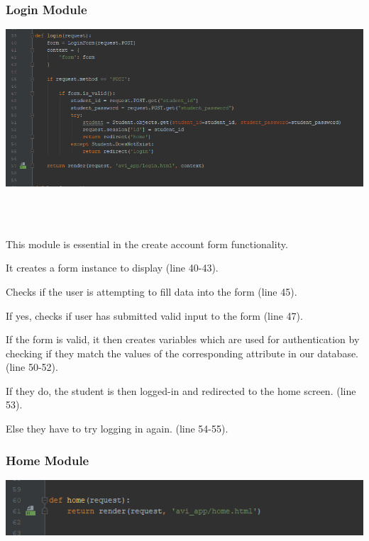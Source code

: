\documentclass[10pt]{article}
\begin{document}
\subsubsection{Login Module}

\begin{center}
\includegraphics[width=1.1\textwidth]{p7.png}
\end{center} \\ \\

\begin{description}[font=$\bullet$~\normalfont\scshape\color{red!50!black}]
\item [] This module is essential in the create account form functionality. 
\item [] It creates a form instance to display (line 40-43).
\item [] Checks if the user is attempting to fill data into the form (line 45).
\item [] If yes, checks if user has submitted valid input to the form (line 47).
\item [] If the form is valid, it then creates variables which are used for authentication by checking if they match the values of the corresponding attribute in our database. (line 50-52).
\item [] If they do, the student is then logged-in and redirected to the home screen. (line 53).
\item [] Else they have to try logging in again. (line 54-55).

\end{description}

\subsubsection{Home Module}

\begin{center}
\includegraphics[width=1.1\textwidth]{p8.png}
\end{center} \\ \\
\end{document}
